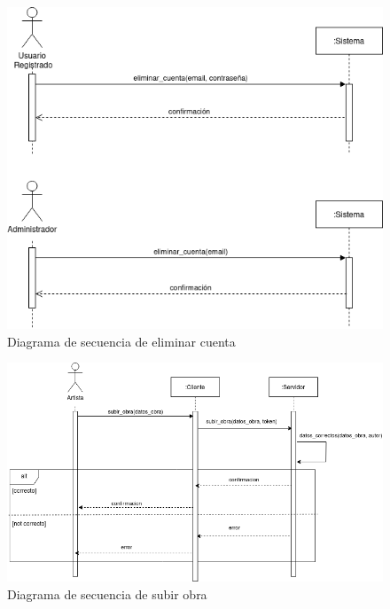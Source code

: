 \begin{figure}[H]
    \centering
    \includegraphics[width=\textwidth]{diagramas/secuencia_eliminar_cuenta.png}
    \caption{Diagrama de secuencia de eliminar cuenta}
    \label{fig:eliminar_cuenta}
\end{figure}

\begin{figure}[H]
    \centering
    \includegraphics[width=\textwidth]{diagramas/secuencia_subir_obra.png}
    \caption{Diagrama de secuencia de subir obra}
    \label{fig:subir_obra}
\end{figure}

